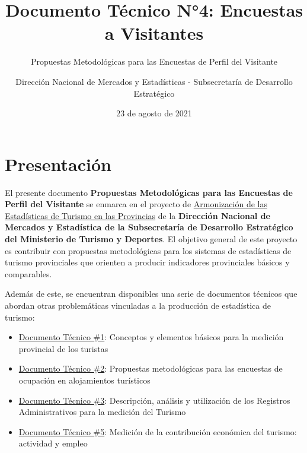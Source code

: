 \documentclass[
]{book}
\title{Documento Técnico N°4: Encuestas a Visitantes}
\subtitle{Propuestas Metodológicas para las Encuestas de Perfil del Visitante}
\author{Dirección Nacional de Mercados y Estadísticas - Subsecretaría de Desarrollo Estratégico}
\date{23 de agosto de 2021}
\let\oldmaketitle\maketitle
\begin{document}
\maketitle


\newpage

\let\maketitle\oldmaketitle
\maketitle

{
\setcounter{tocdepth}{1}
\tableofcontents
}
\hypertarget{presentaciuxf3n}{%
\chapter*{\texorpdfstring{\textbf{Presentación}}{Presentación}}\label{presentaciuxf3n}}

El presente documento \textbf{Propuestas Metodológicas para las Encuestas de Perfil del Visitante} se enmarca en el proyecto de \href{https://armonizacion.yvera.tur.ar//}{Armonización de las Estadísticas de Turismo en las Provincias} de la \textbf{Dirección Nacional de Mercados y Estadística de la Subsecretaría de Desarrollo Estratégico del Ministerio de Turismo y Deportes}. El objetivo general de este proyecto es contribuir con propuestas metodológicas para los sistemas de estadísticas de turismo provinciales que orienten a producir indicadores provinciales básicos y comparables.

Además de este, se encuentran disponibles una serie de documentos técnicos que abordan otras problemáticas vinculadas a la producción de estadística de turismo:

\begin{itemize}
\item
  \href{https://dnme-minturdep.github.io/DT1_medicion_turismo/}{Documento Técnico \#1}: Conceptos y elementos básicos para la medición provincial de los turistas
\item
  \href{https://dnme-minturdep.github.io/DT2_encuestas/}{Documento Técnico \#2}: Propuestas metodológicas para las encuestas de ocupación en alojamientos turísticos
\item
  \href{https://dnme-minturdep.github.io/DT3_registros_adminsitrativos/}{Documento Técnico \#3}: Descripción, análisis y utilización de los Registros Administrativos para la medición del Turismo
\item
  \href{https://dnme-minturdep.github.io/DT5_actividad_empleo/}{Documento Técnico \#5}: Medición de la contribución económica del turismo: actividad y empleo
\end{itemize}
\end{document}
